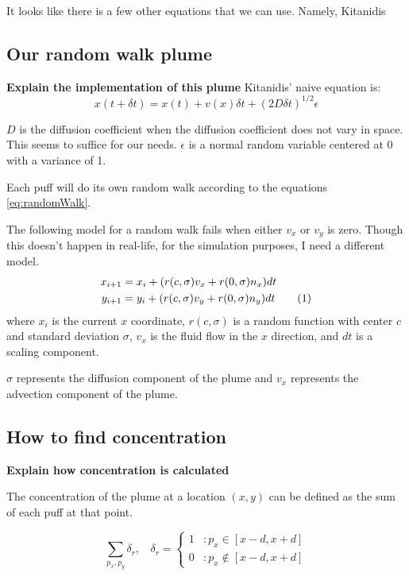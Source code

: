 \documentclass[11pt]{article} %
\newcommand\numberthis{\addtocounter{equation}{1}\tag{\theequation}}
\begin{document}
It looks like there is a few other equations that we can use.  Namely, Kitanidis

\subsection{Our random walk plume}{\bf Explain the implementation of this plume}
Kitanidis' naive equation is:
	$$
		x(t + \delta t) = x(t) + v(x)  \delta t + (2 D\delta t)^{1/2} \epsilon
	$$

$D$ is the diffusion coefficient when the diffusion coefficient does not vary in space.  This seems to suffice for our needs.
$\epsilon$ is a normal random variable centered at 0 with a variance of 1.


Each puff will do its own random walk according to the equations \ref{eq:randomWalk}.

 
The following model for a random walk fails when either $v_x$ or $v_y$ is zero.  Though this doesn't happen in real-life, for the simulation purposes, I need a different model.
\begin{align*}
x_{i+1} &= x_i +( r(c,\sigma) v_x + r(0, \sigma) n_x) dt\\
y_{i+1} &= y_i +( r(c,\sigma) v_y+ r(0, \sigma) n_y) dt\numberthis \label{eq:randomWalk}
\end{align*}
where $x_i$ is the current $x$ coordinate, $r(c,\sigma)$ is a random function with center $c$ and standard deviation $\sigma$, $v_x$ is the fluid flow in the $x$ direction, and $dt$ is a scaling component.   

$\sigma$ represents the diffusion component of the plume and $v_x$ represents the advection component of the plume.  



\subsection{How to find concentration} {\bf Explain how concentration is calculated }

The concentration of the plume at a location $(x,y)$ can be defined as the sum of each puff at that point.  

\begin{equation}
\sum_{p_x, p_y} \delta_r ,\ \ \ \  \delta_r  = \left\{
     \begin{array}{lr}
       1 & : p_x \in [x-d, x+d] \\
       0 & : p_x \notin [x-d, x+d] 
     \end{array}
   \right.
\end{equation}


{}

\end{document}
